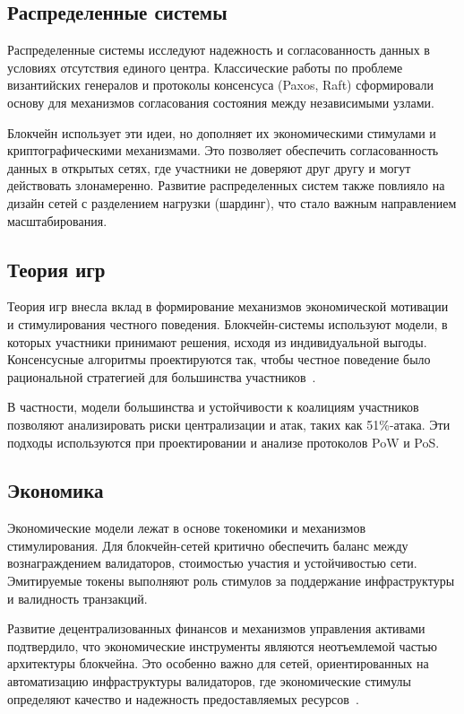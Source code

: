 \subsection{Распределенные системы}\label{sec:ch1/sec1/dist}

Распределенные системы исследуют надежность и согласованность данных в условиях
отсутствия единого центра. Классические работы по проблеме византийских
генералов и протоколы консенсуса (Paxos, Raft) сформировали основу для
механизмов согласования состояния между независимыми узлами.
~\cite{Lamport1982,Lamport2001,Ongaro2014}

Блокчейн использует эти идеи, но дополняет их экономическими стимулами и
криптографическими механизмами. Это позволяет обеспечить согласованность данных
в открытых сетях, где участники не доверяют друг другу и могут действовать
злонамеренно. Развитие распределенных систем также повлияло на дизайн сетей с
разделением нагрузки (шардинг), что стало важным направлением масштабирования.

\subsection{Теория игр}\label{sec:ch1/sec1/game}

Теория игр внесла вклад в формирование механизмов экономической мотивации и
стимулирования честного поведения. Блокчейн-системы используют модели, в которых
участники принимают решения, исходя из индивидуальной выгоды. Консенсусные
алгоритмы проектируются так, чтобы честное поведение было рациональной стратегией
для большинства участников~\cite{VonNeumann1944,Eyal2014}.

В частности, модели большинства и устойчивости к коалициям участников позволяют
анализировать риски централизации и атак, таких как 51\%-атака. Эти подходы
используются при проектировании и анализе протоколов PoW и PoS.

\subsection{Экономика}\label{sec:ch1/sec1/econ}

Экономические модели лежат в основе токеномики и механизмов стимулирования. Для
блокчейн-сетей критично обеспечить баланс между вознаграждением валидаторов,
стоимостью участия и устойчивостью сети. Эмитируемые токены выполняют роль
стимулов за поддержание инфраструктуры и валидность транзакций.

Развитие децентрализованных финансов и механизмов управления активами
подтвердило, что экономические инструменты являются неотъемлемой частью
архитектуры блокчейна. Это особенно важно для сетей, ориентированных на
автоматизацию инфраструктуры валидаторов, где экономические стимулы определяют
качество и надежность предоставляемых ресурсов~\cite{MakerDAO2017,Uniswap2018}.

